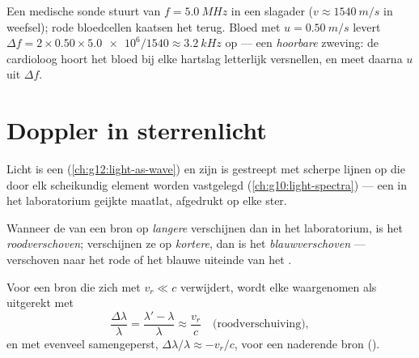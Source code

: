 \begin{example}\label{ex:g12:doppler-effect:ultrasound}
Een medische sonde stuurt  van $f = \qty{5.0}{MHz}$ in een
slagader ($v \approx \qty{1540}{m/s}$ in weefsel); rode bloedcellen
kaatsen het terug. Bloed met $u = \qty{0.50}{m/s}$ levert
$\Delta f = 2 \times 0.50 \times \num{5.0e6}/1540 \approx \qty{3.2}{kHz}$
op --- een \emph{hoorbare} zweving: de cardioloog hoort het bloed bij elke
hartslag letterlijk versnellen, en meet daarna $u$ uit $\Delta f$.
\end{example}

\section{Doppler in sterrenlicht}

Licht is een  (\cref{ch:g12:light-as-wave}) en zijn  is
gestreept met scherpe lijnen op  die door elk scheikundig
element worden vastgelegd (\cref{ch:g10:light-spectra}) --- een in het
laboratorium geijkte maatlat, afgedrukt op elke ster.

\begin{definition}\label{def:g12:doppler-effect:redshift}
Wanneer de  van een bron op \emph{langere} 
verschijnen dan in het laboratorium, is het 
\emph{roodverschoven}; verschijnen ze op
\emph{kortere}, dan is het \emph{blauwverschoven}
--- verschoven naar het rode of het blauwe uiteinde van het .
\end{definition}

\begin{proposition}\label{prop:g12:doppler-effect:light}
Voor een bron die zich met  $v_r \ll c$ verwijdert, wordt
elke  waargenomen als uitgerekt met
\[ \frac{\Delta \lambda}{\lambda} = \frac{\lambda' - \lambda}{\lambda} \approx \frac{v_r}{c} \quad \text{(roodverschuiving)}, \]
en met evenveel samengeperst, $\Delta\lambda/\lambda \approx -v_r/c$, voor
een naderende bron ().
\end{proposition}
\admitted

